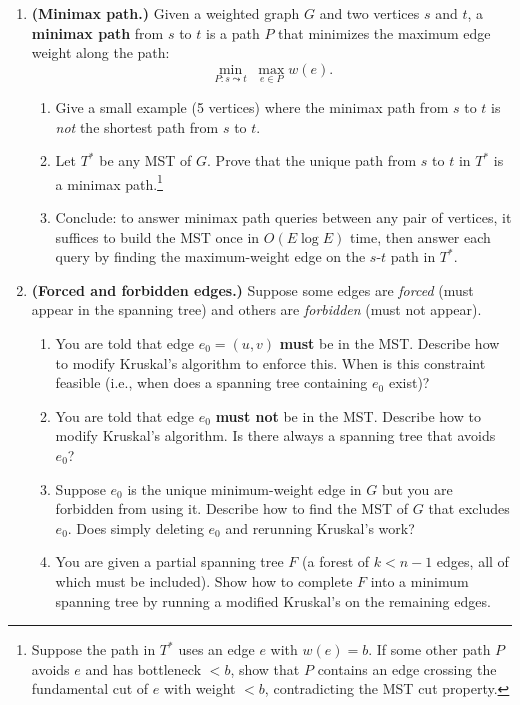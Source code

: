 \documentclass[9pt]{book}
\begin{document}
\begin{enumerate}[label=\arabic*.]
\begin{enumerate}
    \item \textbf{(Minimax path.)}
    Given a weighted graph $G$ and two vertices $s$ and $t$, a \textbf{minimax path} from $s$ to $t$ is a path $P$ that minimizes the maximum edge weight along the path:
    \[
        \min_{P : s \leadsto t} \;\max_{e \in P} w(e).
    \]
    \begin{enumerate}
        \item Give a small example (5 vertices) where the minimax path from $s$ to $t$ is \emph{not} the shortest path from $s$ to $t$.
        \item Let $T^*$ be any MST of $G$. Prove that the unique path from $s$ to $t$ in $T^*$ is a minimax path.\footnote{Suppose the path in $T^*$ uses an edge $e$ with $w(e) = b$. If some other path $P$ avoids $e$ and has bottleneck $< b$, show that $P$ contains an edge crossing the fundamental cut of $e$ with weight $< b$, contradicting the MST cut property.}
        \item Conclude: to answer minimax path queries between any pair of vertices, it suffices to build the MST once in $O(E \log E)$ time, then answer each query by finding the maximum-weight edge on the $s$-$t$ path in $T^*$.
    \end{enumerate}

    \item \textbf{(Forced and forbidden edges.)}
    Suppose some edges are \emph{forced} (must appear in the spanning tree) and others are \emph{forbidden} (must not appear).
    \begin{enumerate}
        \item You are told that edge $e_0 = (u, v)$ \textbf{must} be in the MST. Describe how to modify Kruskal's algorithm to enforce this. When is this constraint feasible (i.e., when does a spanning tree containing $e_0$ exist)?
        \item You are told that edge $e_0$ \textbf{must not} be in the MST. Describe how to modify Kruskal's algorithm. Is there always a spanning tree that avoids $e_0$?
        \item Suppose $e_0$ is the unique minimum-weight edge in $G$ but you are forbidden from using it. Describe how to find the MST of $G$ that excludes $e_0$. Does simply deleting $e_0$ and rerunning Kruskal's work?
        \item You are given a partial spanning tree $F$ (a forest of $k < n-1$ edges, all of which must be included). Show how to complete $F$ into a minimum spanning tree by running a modified Kruskal's on the remaining edges.
    \end{enumerate}


\end{enumerate}
\end{enumerate}
\end{document}
